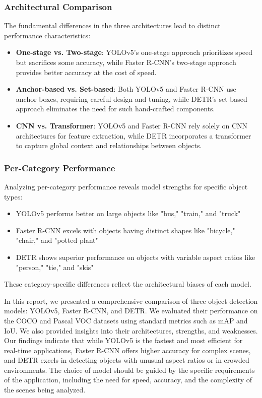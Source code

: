 \documentclass[12pt,a4paper]{article}
\begin{document}
\subsubsection{Architectural Comparison}
The fundamental differences in the three architectures lead to distinct performance characteristics:

\begin{itemize}
    \item \textbf{One-stage vs. Two-stage}: YOLOv5's one-stage approach prioritizes speed but sacrifices some accuracy, while Faster R-CNN's two-stage approach provides better accuracy at the cost of speed.
    
    \item \textbf{Anchor-based vs. Set-based}: Both YOLOv5 and Faster R-CNN use anchor boxes, requiring careful design and tuning, while DETR's set-based approach eliminates the need for such hand-crafted components.
    
    \item \textbf{CNN vs. Transformer}: YOLOv5 and Faster R-CNN rely solely on CNN architectures for feature extraction, while DETR incorporates a transformer to capture global context and relationships between objects.
\end{itemize}

\subsubsection{Per-Category Performance}
Analyzing per-category performance reveals model strengths for specific object types:

\begin{itemize}
    \item YOLOv5 performs better on large objects like "bus," "train," and "truck"
    \item Faster R-CNN excels with objects having distinct shapes like "bicycle," "chair," and "potted plant"
    \item DETR shows superior performance on objects with variable aspect ratios like "person," "tie," and "skis"
\end{itemize}

These category-specific differences reflect the architectural biases of each model.

In this report, we presented a comprehensive comparison of three object detection models: YOLOv5, Faster R-CNN, and DETR.
We evaluated their performance on the COCO and Pascal VOC datasets using standard metrics such as mAP and IoU.
We also provided insights into their architectures, strengths, and weaknesses.
Our findings indicate that while YOLOv5 is the fastest and most efficient for real-time applications, Faster R-CNN offers higher accuracy for complex scenes, and DETR excels in detecting objects with unusual aspect ratios or in crowded environments.
The choice of model should be guided by the specific requirements of the application, including the need for speed, accuracy, and the complexity of the scenes being analyzed.
\end{document}
